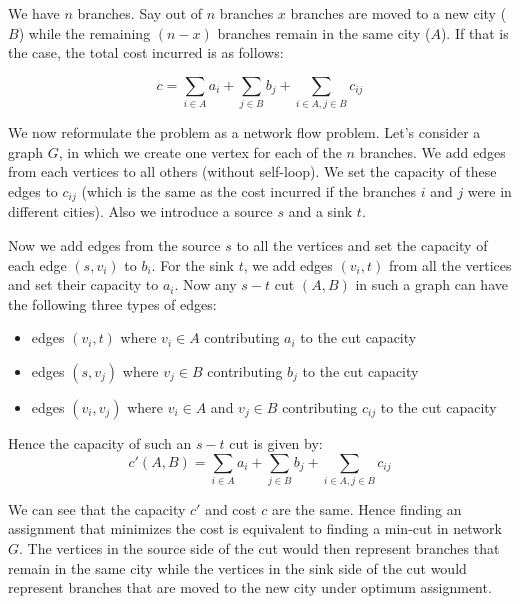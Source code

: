 We have $n$ branches. Say out of $n$ branches $x$ branches are moved to a new city ($B$) while the remaining $(n - x)$ branches remain in the same city ($A$). If that is the case, the total cost incurred is as follows:

\[
  c = \sum\limits_{i \in A} a_i + \sum\limits_{j \in B} b_j + \sum\limits_{i \in A, j \in B} c_{ij}
\]

We now reformulate the problem as a network flow problem. Let's consider a graph $G$, in which we create one vertex for each of the  $n$ branches. We add edges from each vertices to all others (without self-loop). We set the capacity of these edges to $c_{ij}$ (which is the same as the cost incurred if the branches $i$ and $j$ were in different cities). Also we introduce a source $s$ and a sink $t$.

Now we add edges from the source $s$ to all the vertices and set the capacity of each edge $(s, v_i)$ to $b_i$. For the sink $t$, we add edges $(v_i, t)$ from all the vertices and set their capacity to $a_i$. Now any $s-t$ cut $(A, B)$ in such a graph can have the following three types of edges:

\begin{itemize}
\item edges $(v_i, t)$ where $v_i \in A$ contributing $a_i$ to the cut capacity
\item edges $(s, v_j)$ where $v_j \in B$ contributing $b_j$ to the cut capacity
\item edges $(v_i, v_j)$ where $v_i \in A$ and $v_j \in B$ contributing $c_{ij}$ to the cut capacity
\end{itemize}

Hence the capacity of such an $s-t$ cut is given by:\\

\[
  c'(A, B) = \sum\limits_{i \in A} a_i + \sum\limits_{j \in B} b_j + \sum\limits_{i \in A, j \in B} c_{ij}
\]

We can see that the capacity $c'$ and cost $c$ are the same. Hence finding an assignment that minimizes the cost is equivalent to finding a min-cut in network $G$. The vertices in the source side of the cut would then represent branches that remain in the same city while the vertices in the sink side of the cut would represent branches that are moved to the new city under optimum assignment.
